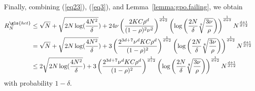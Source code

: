 Finally, combining (\ref{eq23}), (\ref{eq3}), and Lemma~\ref{lemma:gpo.failing}, we obtain
\begin{align*}
    R_N^{\gls{hct}} & \leq \sqrt{N} + \sqrt{2N\log(\frac{4N^2}{\delta}}) + 24\nu\left(\frac{2KC\rho^d}{(1-\rho)^2\nu^2}\right)^{\frac{1}{d+2}}\left(\log\left(\frac{2N}{\delta}\sqrt[8]{\frac{3\nu}{\rho}}\right)\right)^{\frac{1}{d+2}}N^{\frac{d+1}{d+2}} \\
                              & = \sqrt{N} + \sqrt{2N\log(\frac{4N^2}{\delta}}) + 3\left(\frac{2^{3d+7}\nu^d KC\rho^d}{(1-\rho)^{2}}\right)^{\frac{1}{d+2}}\left(\log\left(\frac{2N}{\delta}\sqrt[8]{\frac{3\nu}{\rho}}\right)\right)^{\frac{1}{d+2}}N^{\frac{d+1}{d+2}} \\
                              & \leq 2\sqrt{2N\log(\frac{4N^2}{\delta}}) + 3\left(\frac{2^{3d+7}\nu^d KC\rho^d}{(1-\rho)^{2}}\right)^{\frac{1}{d+2}}\left(\log\left(\frac{2N}{\delta}\sqrt[8]{\frac{3\nu}{\rho}}\right)\right)^{\frac{1}{d+2}}N^{\frac{d+1}{d+2}}
\end{align*}
with probability $1-\delta$.
